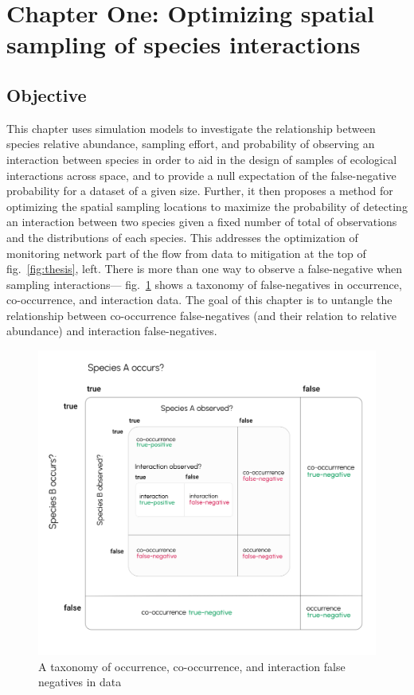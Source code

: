 \documentclass[11pt]{article}
\makeatletter
\def\maxwidth{\ifdim\Gin@nat@width>\linewidth\linewidth
\else\Gin@nat@width\fi}
\let\Oldincludegraphics\includegraphics
\renewcommand{\includegraphics}[1]{\Oldincludegraphics[width=\maxwidth]{#1}}
\makeatother
\begin{document}
\hypertarget{chapter-one-optimizing-spatial-sampling-of-species-interactions}{%
\section{Chapter One: Optimizing spatial sampling of species
interactions}\label{chapter-one-optimizing-spatial-sampling-of-species-interactions}}

\hypertarget{objective}{%
\subsection{Objective}\label{objective}}

This chapter uses simulation models to investigate the relationship
between species relative abundance, sampling effort, and probability of
observing an interaction between species in order to aid in the design
of samples of ecological interactions across space, and to provide a
null expectation of the false-negative probability for a dataset of a
given size. Further, it then proposes a method for optimizing the
spatial sampling locations to maximize the probability of detecting an
interaction between two species given a fixed number of total of
observations and the distributions of each species. This addresses the
optimization of monitoring network part of the flow from data to
mitigation at the top of fig.~\ref{fig:thesis}, left. There is more than
one way to observe a false-negative when sampling interactions---
fig.~\ref{fig:fnrtaxonomy} shows a taxonomy of false-negatives in
occurrence, co-occurrence, and interaction data. The goal of this
chapter is to untangle the relationship between co-occurrence
false-negatives (and their relation to relative abundance) and
interaction false-negatives.

\begin{figure}
\hypertarget{fig:fnrtaxonomy}{%
\centering
\includegraphics{./figures/ch2.png}
\caption{A taxonomy of occurrence, co-occurrence, and interaction false
negatives in data}\label{fig:fnrtaxonomy}
}
\end{figure}
\end{document}
